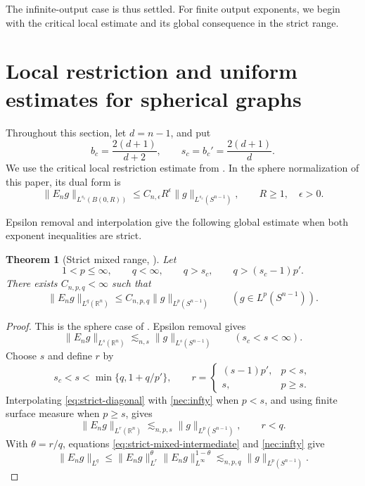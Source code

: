 \documentclass[11pt]{article}
\numberwithin{equation}{section}
\newtheorem{theorem}{Theorem}[section]
\newcommand{\R}{\mathbb{R}}
\newcommand{\norm}[1]{\lVert #1\rVert}
\begin{document}
The infinite-output case is thus settled. For finite output exponents,
we begin with the critical local estimate and its global consequence
in the strict range.


\section{Local restriction and uniform estimates for spherical graphs}
\label{sec:analytic-inputs}

Throughout this section, let \(d=n-1\), and put
\[
 b_c=\frac{2(d+1)}{d+2},\qquad s_c=b_c'=\frac{2(d+1)}d.
\]
We use the critical local restriction estimate from
\cite[Lemma~9.2]{openai-local-smoothing}. In the sphere normalization of
this paper, its dual form is
\begin{equation}\label{eq:critical-local-sphere}
 \norm{E_n g}_{L^{s_c}(B(0,R))}
 \le C_{n,\epsilon}R^\epsilon\norm{g}_{L^{s_c}(S^{n-1})},
 \qquad R\ge1,\quad \epsilon>0.
\end{equation}

Epsilon removal and interpolation give the following global estimate
when both exponent inequalities are strict.

\begin{theorem}[Strict mixed range, \cite{openai-local-smoothing}]
\label{input:strict}
Let
\[
 1<p\le\infty,\qquad q<\infty,\qquad
 q>s_c,\qquad q>(s_c-1)p'.
\]
There exists \(C_{n,p,q}<\infty\) such that
\[
 \norm{E_n g}_{L^q(\R^n)}
 \le C_{n,p,q}\norm{g}_{L^p(S^{n-1})}
 \qquad(g\in L^p(S^{n-1})).
\]
\end{theorem}

\begin{proof}
This is the sphere case of \cite[Corollary~9.3]{openai-local-smoothing}.
Epsilon removal gives
\begin{equation}\label{eq:strict-diagonal}
 \norm{E_n g}_{L^s(\R^n)}
 \lesssim_{n,s}\norm g_{L^s(S^{n-1})}
 \qquad(s_c<s<\infty).
\end{equation}
Choose \(s\) and define \(r\) by
\[
 s_c<s<\min\{q,1+q/p'\},\qquad
 r=\begin{cases}
 (s-1)p',&p<s,\\
 s,&p\ge s.
 \end{cases}
\]
Interpolating \eqref{eq:strict-diagonal} with \eqref{nec:infty}
when \(p<s\), and using finite surface measure when \(p\ge s\), gives
\begin{equation}\label{eq:strict-mixed-intermediate}
 \norm{E_n g}_{L^r(\R^n)}
 \lesssim_{n,p,s}\norm g_{L^p(S^{n-1})},
 \qquad r<q.
\end{equation}
With \(\theta=r/q\), equations \eqref{eq:strict-mixed-intermediate}
and \eqref{nec:infty} give
\[
 \norm{E_n g}_{L^q}
 \le\norm{E_n g}_{L^r}^{\theta}
       \norm{E_n g}_{L^\infty}^{1-\theta}
 \lesssim_{n,p,q}\norm g_{L^p(S^{n-1})}.
\]
\end{proof}
\end{document}
